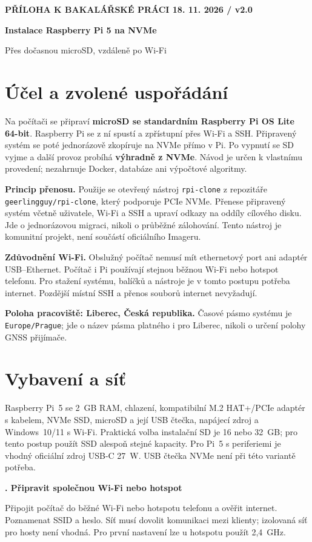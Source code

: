 \documentclass[11pt,a4paper]{article}
\newcounter{postup}
\newcommand{\krok}[1]{\refstepcounter{postup}\par\vspace{0.25em}\textbf{\thepostup. #1}\par}
\begin{document}
{\small\bfseries PŘÍLOHA K BAKALÁŘSKÉ PRÁCI \hfill 18. 11. 2026 / v2.0}\par
{\LARGE\bfseries Instalace Raspberry Pi 5 na NVMe\par}
{\large Přes dočasnou microSD, vzdáleně po Wi-Fi}\par

\section{Účel a zvolené uspořádání}
Na počítači se připraví \textbf{microSD se standardním Raspberry Pi OS Lite 64-bit}. Raspberry Pi se z ní spustí a zpřístupní přes Wi-Fi a SSH. Připravený systém se poté jednorázově zkopíruje na NVMe přímo v Pi. Po vypnutí se SD vyjme a další provoz probíhá \textbf{výhradně z NVMe}. Návod je určen k vlastnímu provedení; nezahrnuje Docker, databáze ani výpočtové algoritmy.

\textbf{Princip přenosu.} Použije se otevřený nástroj \texttt{rpi-clone} z repozitáře \texttt{geerlingguy/rpi-clone}, který podporuje PCIe NVMe. Přenese připravený systém včetně uživatele, Wi-Fi a SSH a upraví odkazy na oddíly cílového disku. Jde o jednorázovou migraci, nikoli o průběžné zálohování. Tento nástroj je komunitní projekt, není součástí oficiálního Imageru.\cite{clone}

\textbf{Zdůvodnění Wi-Fi.} Obslužný počítač nemusí mít ethernetový port ani adaptér USB--Ethernet. Počítač i Pi používají stejnou běžnou Wi-Fi nebo hotspot telefonu. Pro stažení systému, balíčků a nástroje je v tomto postupu potřeba internet. Pozdější místní SSH a přenos souborů internet nevyžadují.\cite{remote}

\textbf{Poloha pracoviště: Liberec, Česká republika.} Časové pásmo systému je \texttt{Europe/Prague}; jde o název pásma platného i pro Liberec, nikoli o určení polohy GNSS přijímače.

\section{Vybavení a síť}
Raspberry Pi~5 se 2~GB RAM, chlazení, kompatibilní M.2 HAT+/PCIe adaptér s kabelem, NVMe SSD, microSD a její USB čtečka, napájecí zdroj a Windows~10/11 s Wi-Fi. Praktická volba instalační SD je 16 nebo 32~GB; pro tento postup použít SSD alespoň stejné kapacity. Pro Pi~5 s periferiemi je vhodný oficiální zdroj USB-C 27~W. USB čtečka NVMe není při této variantě potřeba.\cite{hat,power}

\krok{Připravit společnou Wi-Fi nebo hotspot}
Připojit počítač do běžné Wi-Fi nebo hotspotu telefonu a ověřit internet. Poznamenat SSID a heslo. Síť musí dovolit komunikaci mezi klienty; izolovaná síť pro hosty není vhodná. Pro první nastavení lze u hotspotu použít 2,4~GHz.
\end{document}
